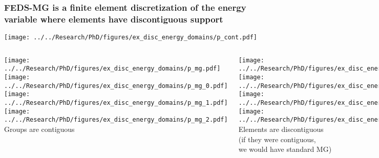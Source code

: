 \documentclass[compress,10pt]{beamer}
\newlength \figwidth
\begin{document}
\begin{frame}
   \frametitle{FEDS-MG is a finite element discretization of the energy variable where elements have discontiguous support}

\setlength {}

\centering
\vspace{-1mm}
{}\texttt{[image: ../../Research/PhD/figures/ex\_disc\_energy\_domains/p\_cont.pdf]}\\
\vspace{7mm}

\begin{columns}[t]


   \setlength {}

   \centering
   {}\texttt{[image: ../../Research/PhD/figures/ex\_disc\_energy\_domains/p\_mg.pdf]}\\

   \vspace{3mm}
   {}\texttt{[image: ../../Research/PhD/figures/ex\_disc\_energy\_domains/p\_mg\_0.pdf]}\\
   {}\texttt{[image: ../../Research/PhD/figures/ex\_disc\_energy\_domains/p\_mg\_1.pdf]}\\
   {}\texttt{[image: ../../Research/PhD/figures/ex\_disc\_energy\_domains/p\_mg\_2.pdf]}\\

   \vspace{2mm}
   {\footnotesize
   Groups are contiguous
   }


   \setlength {}

   \centering
   {}\texttt{[image: ../../Research/PhD/figures/ex\_disc\_energy\_domains/p\_mb.pdf]}\\

   \vspace{3mm}
   {}\texttt{[image: ../../Research/PhD/figures/ex\_disc\_energy\_domains/p\_mb\_0.pdf]}\\
   {}\texttt{[image: ../../Research/PhD/figures/ex\_disc\_energy\_domains/p\_mb\_1.pdf]}\\
   {}\texttt{[image: ../../Research/PhD/figures/ex\_disc\_energy\_domains/p\_mb\_2.pdf]}\\

   \vspace{2mm}
   {\footnotesize
       Elements are discontiguous \\
   }
   { \scriptsize
       (if they were contiguous, \\
       \vspace{-1.8mm}
       we would have standard MG)
   }

   \end{columns}

\end{frame}
\end{document}
